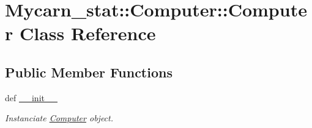 \hypertarget{classMycarn__stat_1_1Computer_1_1Computer}{
\section{\-Mycarn\-\_\-stat\-:\-:\-Computer\-:\-:\-Computer \-Class \-Reference}
\label{classMycarn__stat_1_1Computer_1_1Computer}
}
\subsection*{\-Public \-Member \-Functions}
\begin{DoxyCompactItemize}
\item 
def \hyperlink{classMycarn__stat_1_1Computer_1_1Computer_ae63d5b02fa62bd1f5a8854ec0e7fff9c}{\-\_\-\-\_\-init\-\_\-\-\_\-}
\begin{DoxyCompactList}\small\item\em \-Instanciate \hyperlink{classMycarn__stat_1_1Computer_1_1Computer}{\-Computer} object. \end{DoxyCompactList}\end{DoxyCompactItemize}
